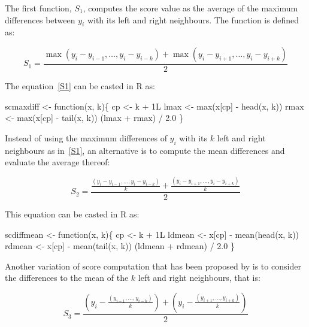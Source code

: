 \documentclass[a4paper]{article}
\begin{document}
The first function, $S_1$, computes the score value as the average of
the maximum differences between $y_i$ with its left and right
neighbours. The function is defined as:

\begin{equation}
\label{S1}
S_1 =
  \frac{\max{(y_i - y_{i-1}, \ldots, y_i - y_{i-k})} + \max{(y_i -
  y_{i+1}, \ldots, y_i - y_{i+k})}}{2}
\end{equation}

The equation~\eqref{S1} can be casted in R as:

\endmoddef
scmaxdiff <- function(x, k)\{
    cp <- k + 1L
    lmax <- max(x[cp] - head(x, k))
    rmax <- max(x[cp] - tail(x, k))
    (lmax + rmax) / 2.0
\}
\eatline
{}\nwendcode{}%

Instead of using the maximum differences of $y_i$ with its $k$ left
and right neighbours as in~\eqref{S1}, an alternative is to compute
the mean differences and evaluate the average thereof:

\begin{equation}
\label{S2}
S_2 = \frac{\frac{(y_i - y_{i-1}, \ldots, y_i - y_{i-k})}{k} +
\frac{(y_i - y_{i+1}, \ldots, y_i - y_{i+k})}{k}}{2}
\end{equation}

This equation can be casted in R as:

\nwenddocs{}\endmoddef
scdiffmean <- function(x, k)\{
    cp <- k + 1L
    ldmean <- x[cp] - mean(head(x, k))
    rdmean <- x[cp] - mean(tail(x, k))
    (ldmean + rdmean) / 2.0
\}
\eatline
{}\nwendcode{}%

Another variation of score computation that has been proposed by
\citet{PAL2009} is to consider the differences to the mean of the $k$
left and right neighbours, that is:

\begin{equation}
\label{S3}
S_3 = \frac{
(y_i - \frac{(y_{i-1}, \ldots, y_{i-k})}{k}) +
(y_i - \frac{(y_{i+1}, \ldots, y_{i+k})}{k})}{2}
\end{equation}
\end{document}
